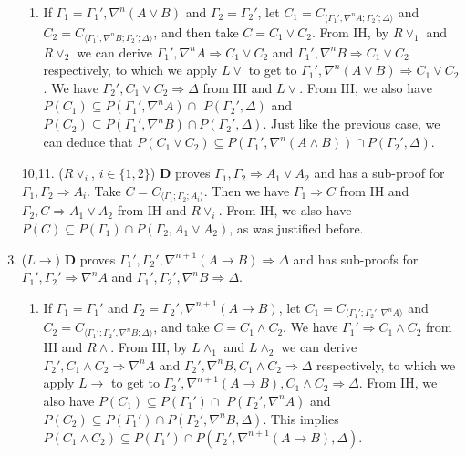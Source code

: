 \begin{enumerate}
\begin{enumerate}
		\item If $\Gamma_1 = \Gamma_1' , \nabla^n (A \lor B)$ and $\Gamma_2 = \Gamma_2'$, let $C_1 = C_{\langle\Gamma_1',\nabla^n A;\Gamma_2';\Delta\rangle}$ and $C_2 = C_{\langle\Gamma_1',\nabla^n B;\Gamma_2';\Delta\rangle}$, and then take $C = C_1 \lor C_2$.
		From IH, by $R\lor_1$ and $R\lor_2$ we can derive $\Gamma_1' , \nabla^n A \Rightarrow C_1 \lor C_2$ and $\Gamma_1' , \nabla^n B \Rightarrow C_1 \lor C_2$ respectively, to which we apply $L\lor$ to get to $\Gamma_1' , \nabla^n (A \lor B) \Rightarrow C_1 \lor C_2$.
		We have $\Gamma_2' , C_1 \lor C_2 \Rightarrow \Delta$ from IH and $L\lor$.
		From IH, we also have $P(C_1) \subseteq P(\Gamma_1' , \nabla^n A) \cap$ $P(\Gamma_2' , \Delta)$ and $P(C_2) \subseteq P(\Gamma_1' , \nabla^n B) \cap P(\Gamma_2' , \Delta)$. Just like the previous case, we can deduce that $P(C_1 \lor C_2) \subseteq P(\Gamma_1' , \nabla^n (A \land B)) \cap P(\Gamma_2' , \Delta)$.
	\end{enumerate}

	\item[10,11.] ($R\lor_i$, {\small$i \in \{1,2\}$}) $\mathbf{D}$ proves $\Gamma_1 , \Gamma_2 \Rightarrow A_1 \lor A_2$ and has a sub-proof for $\Gamma_1 , \Gamma_2 \Rightarrow A_i$. Take $C = C_{\langle\Gamma_1;\Gamma_2;A_i\rangle}$. Then we have $\Gamma_1 \Rightarrow C$ from IH and $\Gamma_2 , C \Rightarrow A_1 \lor A_2$ from IH and $R\lor_i$.
	From IH, we also have $P(C) \subseteq P(\Gamma_1) \cap P(\Gamma_2 , A_1 \lor A_2)$, as was justified before.
	\setcounter{enumi}{11}
	
	\item ($L\rightarrow$) $\mathbf{D}$ proves $\Gamma_1' , \Gamma_2' , \nabla^{n+1} (A \rightarrow B) \Rightarrow \Delta$ and has sub-proofs for $\Gamma_1' , \Gamma_2' \Rightarrow \nabla^n A$ and $\Gamma_1' , \Gamma_2' , \nabla^n B \Rightarrow \Delta$.
	\begin{enumerate}
		\item If $\Gamma_1 = \Gamma_1'$ and $\Gamma_2 = \Gamma_2' , \nabla^{n+1} (A \rightarrow B)$, let $C_1 = C_{\langle\Gamma_1';\Gamma_2';\nabla^n A\rangle}$ and $C_2 = C_{\langle\Gamma_1';\Gamma_2',\nabla^n B;\Delta\rangle}$, and take $C = C_1 \land C_2$.
		We have $\Gamma_1' \Rightarrow C_1 \land C_2$ from IH and $R\land$.
		From IH, by $L\land_1$ and $L\land_2$ we can derive $\Gamma_2' , C_1 \land C_2 \Rightarrow \nabla^n A$ and $\Gamma_2' , \nabla^n B , C_1 \land C_2 \Rightarrow \Delta$ respectively, to which we apply $L\rightarrow$ to get to $\Gamma_2' , \nabla^{n+1} (A \rightarrow B) , C_1 \land C_2 \Rightarrow \Delta$.
		From IH, we also have $P(C_1) \subseteq P(\Gamma_1') \cap$ $P(\Gamma_2' , \nabla^n A)$ and $P(C_2) \subseteq P(\Gamma_1') \cap P(\Gamma_2' , \nabla^n B , \Delta)$. This implies $P(C_1 \land C_2) \subseteq P(\Gamma_1') \cap P(\Gamma_2' , \nabla^{n+1} (A \rightarrow B) , \Delta)$.


\end{enumerate}
\end{enumerate}
